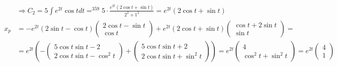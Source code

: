 \documentclass{article}
\DeclareMathOperator*{\equals}{=}
\begin{document}
\begin{align*}
                                                 & \Rightarrow C_2=5\int e^{2t}\cos t dt \equals^{359} 5\cdot \frac{e^{2t}(2\cos t + \sin t)}{2^2+1^2} = e^{2t}(2\cos t + \sin t)    \\
    x_p                                          & = -e^{2t}(2\sin t - \cos t)\begin{pmatrix}
                                                                                  2\cos t - \sin t \\
                                                                                  \cos t
                                                                              \end{pmatrix}+e^{2t}(2\cos t + \sin t)\begin{pmatrix}
                                                                                                                        \cos t + 2\sin t \\
                                                                                                                        \sin t
                                                                                                                    \end{pmatrix}=                                                 \\
                                                 & =e^{2t}(-\begin{pmatrix}
                                                                5\cos t\sin t - 2 \\
                                                                2\cos t\sin t - \cos ^2 t
                                                            \end{pmatrix}+\begin{pmatrix}
                                                                              5\cos t \sin t + 2 \\
                                                                              2\cos t \sin t +\sin^2t
                                                                          \end{pmatrix})=e^{2t}\begin{pmatrix}
                                                                                                   4 \\
                                                                                                   \cos^2t+\sin^2t
                                                                                               \end{pmatrix}=e^{2t}\begin{pmatrix}
                                                                                                                       4 \\
                                                                                                                       1
                                                                                                                   \end{pmatrix}
\end{align*}
\end{document}
